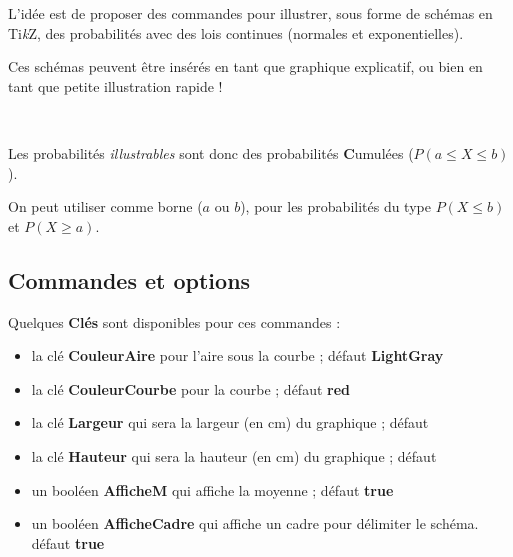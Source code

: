 \documentclass[a4paper,french,11pt]{article}
\providecommand\tikzlogo{Ti\textit{k}Z}
\let\TikZ\tikzlogo
\newcommand\ctex[1]{\tcbox[vignettelatex]{#1}}
\newcommand\Cle[1]{{\bfseries\sffamily\textlangle #1\textrangle}}
\begin{document}
\begin{codeidee}
L'idée est de proposer des commandes pour illustrer, sous forme de schémas en \TikZ, des probabilités avec des lois continues (normales et exponentielles).

\smallskip

Ces \og schémas \fg{} peuvent être insérés en tant que graphique explicatif, ou bien en tant que petite illustration rapide !
\end{codeidee}

\begin{codetex}

\end{codetex}

\begin{codesortie}
\hfill{}\hspace{3cm}\hfill~
\end{codesortie}

\begin{codecles}
Les probabilités \textit{illustrables} sont donc des probabilités \textbf{C}umulées ($P(a\leqslant X\leqslant b)$).

\smallskip

On peut utiliser \ctex{*} comme borne ($a$ ou $b$), pour les probabilités du type $P(X\leqslant b)$ et $P(X \geqslant a)$.
\end{codecles}

\subsection{Commandes et options}

\begin{codecles}
Quelques \Cle{Clés} sont disponibles pour ces commandes :

\begin{itemize}
	\item la clé \Cle{CouleurAire} pour l'aire sous la courbe ; \hfill{}défaut \Cle{LightGray}
	\item la clé \Cle{CouleurCourbe} pour la courbe ; \hfill{}défaut \Cle{red}
	\item la clé \Cle{Largeur} qui sera la largeur (en cm) du graphique ; \hfill{}défaut \Cle{2}
	\item la clé \Cle{Hauteur} qui sera la hauteur (en cm) du graphique ; \hfill{}défaut \Cle{1}
	\item un booléen \Cle{AfficheM} qui affiche la moyenne ; \hfill{}défaut \Cle{true}
	\item un booléen \Cle{AfficheCadre} qui affiche un cadre pour délimiter le schéma. \hfill{}défaut \Cle{true}
\end{itemize}
\end{codecles}
\end{document}
